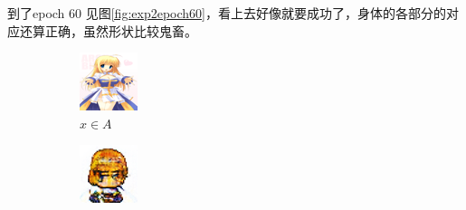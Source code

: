 \documentclass[twocolumn,11pt]{ctexart}
\begin{document}
到了epoch 60 见图\ref{fig:exp2epoch60}，看上去好像就要成功了，身体的各部分的对应还算正确，虽然形状比较鬼畜。

\begin{figure}[htb]
    \centering
    \begin{subfigure}[b]{0.23\linewidth}
        \includegraphics[width=\linewidth]{exp2_epoch060_real_A.png}
        \caption{$x \in A$}
      \end{subfigure}
      \begin{subfigure}[b]{0.23\linewidth}
        \includegraphics[width=\linewidth]{exp2_epoch060_fake_B.png}

\end{subfigure}
\end{figure}
\end{document}

